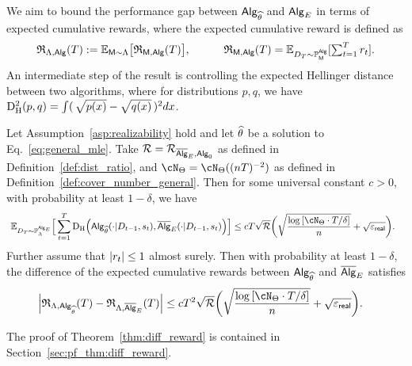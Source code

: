We aim to bound the performance gap between ${\mathsf{Alg}}_{{\widehat{\theta}}}$ and ${\mathsf{Alg}}_{E}$ in terms of expected cumulative rewards, where the expected cumulative reward is defined as 
\begin{align*}
\textstyle {\mathfrak{R}}_{{\Lambda},{\mathsf{Alg}}}({T})
:= \mathbb{E}_{{\mathsf{M}}\sim{\Lambda}}\big[{\mathfrak{R}}_{{\mathsf{M}},{\mathsf{Alg}}}({T}) \big],~~~~~~~~~ {\mathfrak{R}}_{{\mathsf{M}},{\mathsf{Alg}}}({T}) = \mathbb{E}_{{D}_{{T}} \sim\mathbb{P}^{{\mathsf{Alg}}}_{\mathsf{M}}}[\sum_{t=1}^{T} {r}_t].
\end{align*}
An intermediate step of the result is controlling the expected Hellinger distance between two algorithms, where for distributions $p, q$, we have ${\mathrm{D}^2_{\mathrm{H}}}(p, q) = \int (\,\sqrt{p(x)} - \sqrt{q(x)} \,)^2 d x$. 

\begin{theorem}\label{thm:diff_reward} Let Assumption~\ref{asp:realizability} hold and let ${\widehat{\theta}}$ be a solution to Eq.~\eqref{eq:general_mle}. Take ${\mathcal{R}} = {\mathcal{R}}_{\overline{\mathsf{Alg}}_{E},{\mathsf{Alg}}_0}$ as defined in Definition~\ref{def:dist_ratio}, and $\cN_{\Parspace} = \cN_{\Parspace}((\Numobs\totlen)^{-2})$  as defined in Definition~\ref{def:cover_number_general}. Then for some universal constant $c>0$, with probability at least $1-\delta$, we have 
\begin{align}\label{eqn:Hellinger-bound-main-theorem}
&~ \E_{\dset_\totlen\sim \P^{\sAlg_\shortexp}_\prior}\Big[ \sum_{t=1}^\totlen \HelD \paren{  \sAlg_{{\EstPar}}(\cdot|\dset_{t-1},\state_t ),\osAlg_{\shortexp}(\cdot|\dset_{t-1},\state_t )} \Big] 
\le c {\totlen} \sqrt{\distratio}
\bigg(\sqrt{\frac{\log \brac{ \cN_{\Parspace} \cdot 
 \totlen/\delta } }{n}} +  \sqrt{\geneps}\bigg).
\end{align} 
Further assume that $|{r}_t| \leq 1$ almost surely. Then with probability at least $1-\delta$, the difference of the expected cumulative rewards between ${\mathsf{Alg}}_{\widehat{\theta}}$ and $\overline{\mathsf{Alg}}_{E}$ satisfies
\begin{align}\label{eqn:reward-bound-main-theorem}
\Big|\totreward_{\prior,\sAlg_\EstPar}(\totlen)-\totreward_{\prior,\osAlg_\shortexp}(\totlen)\Big|
&\leq 
c \totlen^2 \sqrt{\distratio} \bigg(\sqrt{\frac{\log \brac{ \cN_{\Parspace} \cdot 
 \totlen/\delta } }{n}} +  \sqrt{\geneps}\bigg).
\end{align}
\end{theorem}

The proof of Theorem~\ref{thm:diff_reward} is contained in Section~\ref{sec:pf_thm:diff_reward}.

